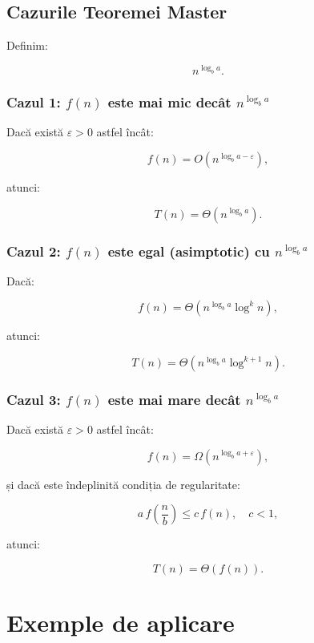 \documentclass[12pt]{article}
\begin{document}
\subsection{Cazurile Teoremei Master}

Definim:


\[
n^{\log_b a}.
\]



\subsubsection*{Cazul 1: $f(n)$ este mai mic decât $n^{\log_b a}$}

Dacă există $\varepsilon > 0$ astfel încât:


\[
f(n) = O\left(n^{\log_b a - \varepsilon}\right),
\]


atunci:


\[
T(n) = \Theta\left(n^{\log_b a}\right).
\]



\subsubsection*{Cazul 2: $f(n)$ este egal (asimptotic) cu $n^{\log_b a}$}

Dacă:


\[
f(n) = \Theta\left(n^{\log_b a} \log^k n\right),
\]


atunci:


\[
T(n) = \Theta\left(n^{\log_b a} \log^{k+1} n\right).
\]



\subsubsection*{Cazul 3: $f(n)$ este mai mare decât $n^{\log_b a}$}

Dacă există $\varepsilon > 0$ astfel încât:


\[
f(n) = \Omega\left(n^{\log_b a + \varepsilon}\right),
\]


și dacă este îndeplinită condiția de regularitate:


\[
a\,f\left(\frac{n}{b}\right) \le c\,f(n), \quad c < 1,
\]


atunci:


\[
T(n) = \Theta(f(n)).
\]



\section{Exemple de aplicare}
\end{document}
